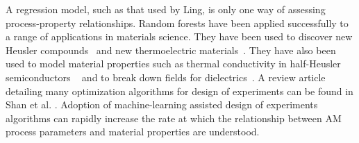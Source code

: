 A regression model, such as that used by Ling, is only one way of assessing process-property relationships. Random forests have been applied successfully to a range of applications in materials science. They have been used to discover new Heusler compounds~\cite{Oliynyk2016} and new thermoelectric materials~\cite{Gaultois2016}. They have also been used to model material properties such as thermal conductivity in half-Heusler semiconductors ~\cite{Carrete2014} and to break down fields for dielectrics~\cite{Kim2016}.  A review article detailing many optimization algorithms for design of experiments can be found in Shan et al. \cite{Shan2010}. Adoption of machine-learning assisted design of experiments algorithms can rapidly increase the rate at which the relationship between AM process parameters and material properties are understood. 
